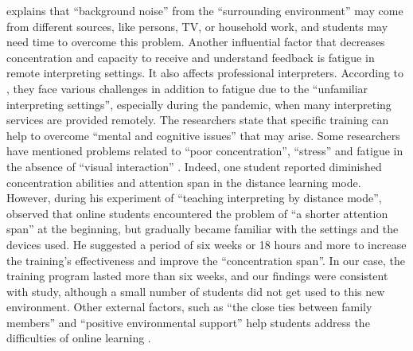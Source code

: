 \documentclass[english]{textolivre}
\begin{document}
\textcite[p. 826]{ko_teaching_2009} explains that “background noise” from the “surrounding environment” may come from different sources, like persons, TV, or household work, and students may need time to overcome this problem. Another influential factor that decreases concentration and capacity to receive and understand feedback is fatigue in remote interpreting settings. It also affects professional interpreters. According to \textcite[p. 9]{karaban_exploring_2021}, they face various challenges in addition to fatigue due to the “unfamiliar interpreting settings”, especially during the pandemic, when many interpreting services are provided remotely. The researchers state that specific training can help to overcome “mental and cognitive issues” that may arise.  Some researchers have mentioned problems related to “poor concentration”, “stress” and fatigue in the absence of “visual interaction” \cite[p. 827]{ko_teaching_2009}. Indeed, one student reported diminished concentration abilities and attention span in the distance learning mode. However, during his experiment of “teaching interpreting by distance mode”, \textcite[p. 827]{ko_teaching_2009} observed that online students encountered the problem of “a shorter attention span” at the beginning, but gradually became familiar with the settings and the devices used. He suggested a period of six weeks or 18 hours and more to increase the training’s effectiveness and improve the “concentration span”. In our case, the training program lasted more than six weeks, and our findings were consistent with  study, although a small number of students did not get used to this new environment. Other external factors, such as “the close ties between family members” and “positive environmental support” help students address the difficulties of online learning \cite[p. 16]{susilana_studentsa_2020}.
\end{document}
